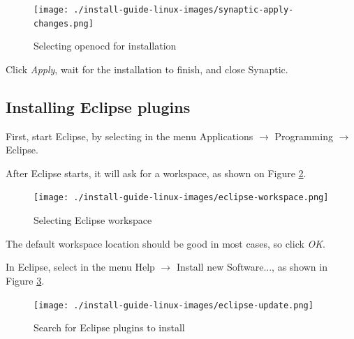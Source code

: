 \documentclass[a4paper, 10pt]{article}
\begin{document}
    \begin{figure}[H]
    \centering
        \texttt{[image: ./install-guide-linux-images/synaptic-apply-changes.png]}
        \caption{Selecting openocd for installation}
        \label{fig:synaptic-apply-changes.png}
    \end{figure}

Click \emph{Apply}, wait for the installation to finish, and close Synaptic.

\subsection{Installing Eclipse plugins}

First, start Eclipse, by selecting in the menu Applications $\rightarrow$
Programming $\rightarrow$ Eclipse.

After Eclipse starts, it will ask for a workspace, as shown on Figure \ref{fig:eclipse-workspace}.

    \begin{figure}[H]
    \centering
        \texttt{[image: ./install-guide-linux-images/eclipse-workspace.png]}
        \caption{Selecting Eclipse workspace}
        \label{fig:eclipse-workspace}
    \end{figure}

The default workspace location should be good in most cases, so click \emph{OK}.

In Eclipse, select in the menu Help $\rightarrow$ Install new Software..., as shown in
Figure \ref{fig:eclipse-update}.

    \begin{figure}[H]
    \centering
        \texttt{[image: ./install-guide-linux-images/eclipse-update.png]}
        \caption{Search for Eclipse plugins to install}
        \label{fig:eclipse-update}
    \end{figure}



%
\end{document}
